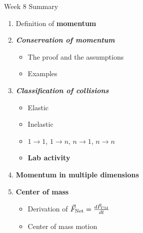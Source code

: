 \documentclass{beamer}
\begin{document}
\begin{frame}{Week 8 Summary}
\begin{enumerate}
\item Definition of \alert{\textbf{momentum}}
\item \alert{\textbf{\textit{Conservation of momentum}}}
\begin{itemize}
\item The proof and the assumptions
\item Examples
\end{itemize}
\item \alert{\textbf{\textit{Classification of collisions}}}
\begin{itemize}
\item Elastic
\item Inelastic
\item $1 \rightarrow 1$, $1 \rightarrow n$, $n \rightarrow 1$, $n \rightarrow n$
\item \textbf{Lab activity}
\end{itemize}
\item \textbf{Momentum in multiple dimensions}
\item \textbf{Center of mass}
\begin{itemize}
\item Derivation of $\vec{F}_{\rm Net} = \frac{d\vec{P}_{\rm CM}}{dt}$
\item Center of mass motion
\end{itemize}
\end{enumerate}
\end{frame}
\end{document}
